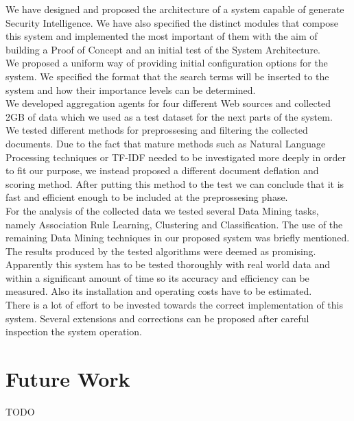 \documentclass[12pt]{article}
\begin{document}
We have designed and proposed the architecture of a system capable of generate Security Intelligence. We have also specified the distinct modules that compose this system and implemented the most important of them with the aim of building a Proof of Concept and an initial test of the System Architecture. 
\hfill \break\\
We proposed a uniform way of providing initial configuration options for the system. We specified the format that the search terms will be inserted to the system and how their importance levels can be determined. 
\hfill \break\\
We developed aggregation agents for four different Web sources and collected 2GB of data which we used as a test dataset for the next parts of the system. 
\hfill \break\\
We tested different methods for preprossesing and filtering the collected documents. Due to the fact that mature methods such as Natural Language Processing techniques or TF-IDF needed to be investigated more deeply in order to fit our purpose, we instead proposed a different document deflation and scoring method. After putting this method to the test we can conclude that it is fast and efficient enough to be included at the preprossesing phase. 
\hfill \break\\
For the analysis of the collected data we tested several Data Mining tasks, namely Association Rule Learning, Clustering and Classification. The use of the remaining Data Mining techniques in our proposed system was briefly mentioned. The results produced by the tested algorithms were deemed as promising. 
\hfill \break\\
Apparently this system has to be tested thoroughly with real world data and within a significant amount of time so its accuracy and efficiency can be measured. Also its installation and operating costs have to be estimated. 
\hfill \break\\
There is a lot of effort to be invested towards the correct implementation of this system. Several extensions and corrections can be proposed after careful inspection the system operation. 


\newpage
\section{Future Work} TODO
\end{document}
